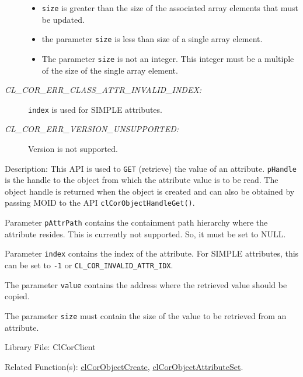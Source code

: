 \begin{flushleft}
\begin{Desc}
\begin{description}
\begin{itemize}
\item {\tt{size}} is greater than the size of the associated array elements that must be updated.
\item the parameter {\tt{size}} is less than size of a single array element.
\item The parameter {\tt{size}} is not an integer. This integer must be a multiple of the size of the single array element.
\end{itemize}
\item[{\em CL\_\-COR\_\-ERR\_\-CLASS\_\-ATTR\_\-INVALID\_\-INDEX:}] {\tt{index}} is used for SIMPLE attributes. 
\item[{\em CL\_\-COR\_\-ERR\_\-VERSION\_\-UNSUPPORTED:}] Version is not supported.\end{description}
\end{Desc}
\begin{Desc}
\item[Description:]This API is used to {\tt{GET}} (retrieve) the value of an attribute. {\tt{pHandle}} is the handle to the object from which the 
attribute value is to be read.
The object handle is returned when the object is created and can also be obtained by passing MOID to the API {\tt{clCorObjectHandleGet()}}.
\par
Parameter {\tt{pAttrPath}} contains the containment path hierarchy where the attribute resides. This is currently not supported. So, it must be set to 
NULL.
\par
Parameter {\tt{index}} contains the index of the attribute. For SIMPLE attributes, this can be set to {\tt{-1}} or 
{\tt{CL\_\-COR\_\-INVALID\_\-ATTR\_\-IDX}}. 
\par
The parameter {\tt{value}} contains the address where the retrieved value should be copied. 
\par
The parameter {\tt{size}} must contain the size of the value to be retrieved from an attribute.
\end{Desc}
\begin{Desc}
\item[Library File:]Cl\-Cor\-Client\end{Desc}
\begin{Desc}
\item[Related Function(s):]\hyperlink{pagecor100}{cl\-Cor\-Object\-Create}, \hyperlink{pagecor101}{cl\-Cor\-Object\-Attribute\-Set}. \end{Desc}
\newpage







\end{flushleft}
